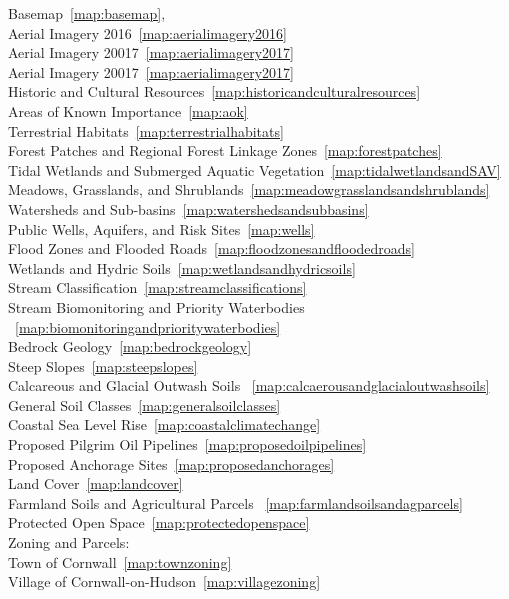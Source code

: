 Basemap\dotfill~\ref{map:basemap}, ~\pageref{map:basemap}\\
Aerial Imagery 2016\dotfill~\ref{map:aerialimagery2016}\\
Aerial Imagery 20017\dotfill~\ref{map:aerialimagery2017}\\
Aerial Imagery 20017\dotfill~\ref{map:aerialimagery2017}\\
Historic and Cultural Resources\dotfill~\ref{map:historicandculturalresources}\\
Areas of Known Importance\dotfill~\ref{map:aok}\\
Terrestrial Habitats\dotfill~\ref{map:terrestrialhabitats}\\
Forest Patches and Regional Forest Linkage Zones\dotfill~\ref{map:forestpatches} \\
Tidal Wetlands and Submerged Aquatic Vegetation\dotfill~\ref{map:tidalwetlandsandSAV}\\
Meadows, Grasslands, and Shrublands\dotfill~\ref{map:meadowgrasslandsandshrublands}\\
Watersheds and Sub-basins\dotfill~\ref{map:watershedsandsubbasins}\\
Public Wells, Aquifers, and Risk Sites\dotfill~\ref{map:wells}\\
Flood Zones and Flooded Roads\dotfill~\ref{map:floodzonesandfloodedroads}\\
Wetlands and Hydric Soils\dotfill~\ref{map:wetlandsandhydricsoils}\\
Stream Classification\dotfill~\ref{map:streamclassifications}\\
Stream Biomonitoring and Priority Waterbodies 
\dotfill~\ref{map:biomonitoringandprioritywaterbodies}\\
Bedrock Geology\dotfill~\ref{map:bedrockgeology}\\
Steep Slopes\dotfill~\ref{map:steepslopes}\\
Calcareous and Glacial Outwash Soils \dotfill ~\ref{map:calcaerousandglacialoutwashsoils}\\
General Soil Classes\dotfill~\ref{map:generalsoilclasses}\\
Coastal Sea Level Rise\dotfill~\ref{map:coastalclimatechange}\\
Proposed Pilgrim Oil Pipelines\dotfill~\ref{map:proposedoilpipelines}\\
Proposed Anchorage Sites\dotfill~\ref{map:proposedanchorages}\\
Land Cover\dotfill~\ref{map:landcover}\\
Farmland Soils and Agricultural Parcels \dotfill~\ref{map:farmlandsoilsandagparcels}\\
Protected Open Space\dotfill~\ref{map:protectedopenspace} \\
Zoning and Parcels:\\
Town of Cornwall\dotfill~\ref{map:townzoning}\\
Village of Cornwall-on-Hudson\dotfill~\ref{map:villagezoning}\\


